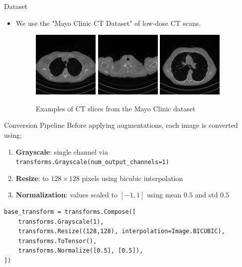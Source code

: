 

\begin{frame}{Dataset}
  \begin{itemize}
    \item We use the "Mayo Clinic CT Dataset" of low-dose CT scans.
 \begin{figure}
    \centering
    \includegraphics[width=0.3\textwidth]{media/2.png}
    \includegraphics[width=0.3\textwidth]{media/3.png}
    \includegraphics[width=0.3\textwidth]{media/100.png}
    \caption{Examples of CT slices from the Mayo Clinic dataset}
  \end{figure}  
  \end{itemize}
\end{frame}

\begin{frame}[fragile]{Conversion Pipeline}
  Before applying augmentations, each image is converted using:
  \begin{enumerate}
    \item \textbf{Grayscale}: single channel via \texttt{transforms.Grayscale(num\_output\_channels=1)}
    \item \textbf{Resize}: to $128\times128$ pixels using bicubic interpolation
    \item \textbf{Normalization}: values scaled to $[-1,1]$ using mean $0.5$ and std $0.5$
  \end{enumerate}
  \vspace{0.5em}
  \begin{verbatim}
base_transform = transforms.Compose([
    transforms.Grayscale(1),
    transforms.Resize((128,128), interpolation=Image.BICUBIC),
    transforms.ToTensor(),
    transforms.Normalize([0.5], [0.5]),
])
  \end{verbatim}
\end{frame}


